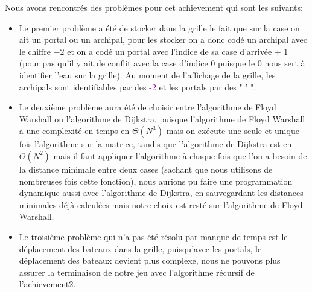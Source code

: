 Nous avons rencontrés des problèmes pour cet achievement qui sont les suivants:
\begin{itemize}
\item Le premier problème a été de stocker dans la grille le fait que sur la case on ait un portal ou un archipal, pour les stocker on a donc codé un archipal avec le chiffre $-2$ et on a codé un portal avec l'indice de sa case d'arrivée + 1 (pour pas qu'il y ait de conflit avec la case d'indice 0 puisque le 0 nous sert à identifier l'eau sur la grille). Au moment de l'affichage de la grille, les archipals sont identifiables par des \textcolor{purple}{-2} et les portals par des " ' ".\\
\item Le deuxième problème aura été de choisir entre l'algorithme de Floyd Warshall ou l'algorithme de Dijkstra, puisque l'algorithme de Floyd Warshall a une complexité en temps en $\Theta(N^{3})$ mais on exécute une seule et unique fois l'algorithme sur la matrice, tandis que l'algorithme de Dijkstra est en $\Theta(N^{2})$ mais il faut appliquer l'algorithme à chaque fois que l'on a besoin de la distance minimale entre deux cases (sachant que nous utilisons de nombreuses fois cette fonction), nous aurions pu faire une programmation dynamique aussi avec l'algorithme de Dijkstra, en sauvegardant les distances minimales déjà calculées mais notre choix est resté sur l'algorithme de Floyd Warshall.\\
\item Le troisième problème qui n'a pas été résolu par manque de temps est le déplacement des bateaux dans la grille, puisqu'avec les portals, le déplacement des bateaux devient plus complexe, nous ne pouvons plus assurer la terminaison de notre jeu avec l'algorithme récursif de l'achievement2. 
\end{itemize}
